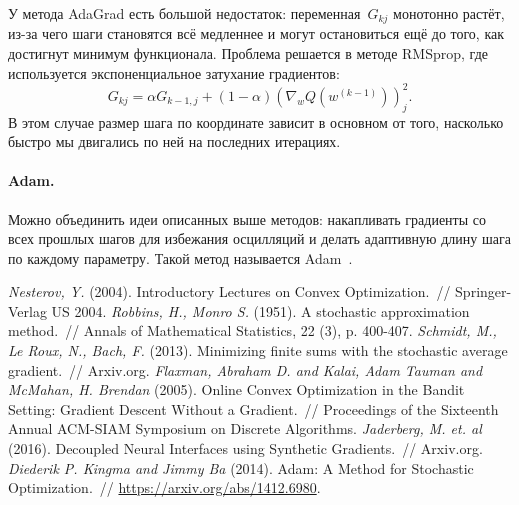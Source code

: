 \documentclass[12pt,fleqn]{article}
\begin{document}
У метода AdaGrad есть большой недостаток: переменная~$G_{kj}$ монотонно растёт,
из-за чего шаги становятся всё медленнее и могут остановиться ещё до того,
как достигнут минимум функционала.
Проблема решается в методе RMSprop, где используется экспоненциальное затухание градиентов:
\[
    G_{kj} = \alpha G_{k-1,j} + (1 - \alpha) (\nabla_w Q(w^{(k-1)}))_j^2.
\]
В этом случае размер шага по координате зависит в основном от того, насколько
быстро мы двигались по ней на последних итерациях.

\paragraph{Adam.}
Можно объединить идеи описанных выше методов: накапливать градиенты со всех прошлых шагов для
избежания осцилляций и делать адаптивную длину шага по каждому параметру.
Такой метод называется Adam~\cite{kingma14adam}.

\begin{thebibliography}{1}
    \emph{Nesterov, Y.} (2004).
    Introductory Lectures on Convex Optimization.~//
    Springer-Verlag US 2004.
    \emph{Robbins, H., Monro S.} (1951).
    A stochastic approximation method.~//
    Annals of Mathematical Statistics,
    22 (3), p. 400-407.
    \emph{Schmidt, M., Le Roux, N., Bach, F. } (2013).
    Minimizing finite sums with the stochastic average gradient.~//
    Arxiv.org.
    \emph{Flaxman, Abraham D. and Kalai, Adam Tauman and McMahan, H. Brendan} (2005).
    Online Convex Optimization in the Bandit Setting: Gradient Descent Without a Gradient.~//
    Proceedings of the Sixteenth Annual ACM-SIAM Symposium on Discrete Algorithms.
    \emph{Jaderberg, M. et. al} (2016).
    Decoupled Neural Interfaces using Synthetic Gradients.~//
    Arxiv.org.
    \emph{Diederik P. Kingma and Jimmy Ba} (2014).
    Adam: A Method for Stochastic Optimization.~//
    \url{https://arxiv.org/abs/1412.6980}.
\end{thebibliography}
\end{document}
